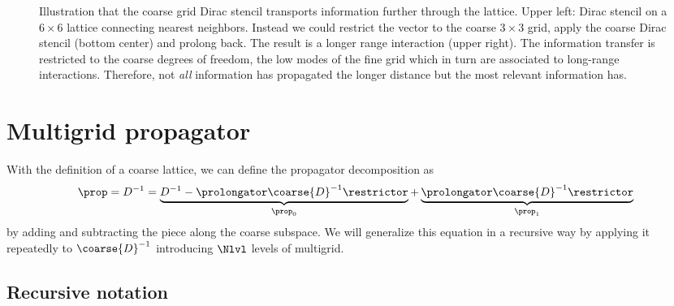 \begin{figure}
\centering

\caption{Illustration that the coarse grid Dirac stencil transports information further through the lattice. Upper left: Dirac stencil on a $6 \times 6$ lattice connecting nearest neighbors. Instead we could restrict the vector to the coarse $3 \times 3$ grid, apply the coarse Dirac stencil (bottom center) and prolong back. The result is a longer range interaction (upper right). The information transfer is restricted to the coarse degrees of freedom, \ie the low modes of the fine grid which in turn are associated to long-range interactions. Therefore, not \emph{all} information has propagated the longer distance but the most relevant information has.}
\label{fig:coarse:stencil}
\end{figure}

\section{Multigrid propagator}

With the definition of a coarse lattice, we can define the propagator decomposition as
\begin{equation} \label{eq:mg:prop:decomp:2lvl}
\prop = D^{-1}
= \underbrace{
	D^{-1}
	- \prolongator \coarse{D}^{-1} \restrictor
}_{\prop_0}
+ \underbrace{
	\prolongator \coarse{D}^{-1} \restrictor
}_{\prop_1}
\end{equation}
by adding and subtracting the piece along the coarse subspace.
We will generalize this equation in a recursive way by applying it repeatedly to $\coarse{D}^{-1}$ introducing $\Nlvl$ levels of multigrid.

\subsection{Recursive notation}

